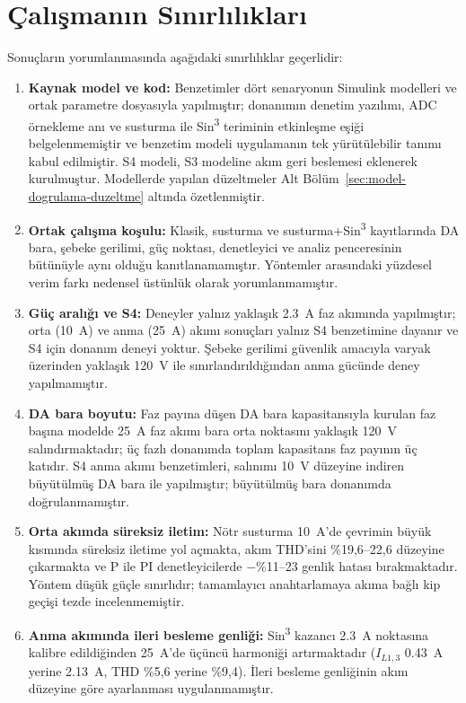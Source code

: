 \section{Çalışmanın Sınırlılıkları}

Sonuçların yorumlanmasında aşağıdaki sınırlılıklar geçerlidir:

\begin{enumerate}
  \item \textbf{Kaynak model ve kod:} Benzetimler dört senaryonun Simulink modelleri ve ortak parametre dosyasıyla yapılmıştır; donanımın denetim yazılımı, ADC örnekleme anı ve susturma ile Sin\textsuperscript{3} teriminin etkinleşme eşiği belgelenmemiştir ve benzetim modeli uygulamanın tek yürütülebilir tanımı kabul edilmiştir. S4 modeli, S3 modeline akım geri beslemesi eklenerek kurulmuştur. Modellerde yapılan düzeltmeler Alt Bölüm~\ref{sec:model-dogrulama-duzeltme} altında özetlenmiştir.
  \item \textbf{Ortak çalışma koşulu:} Klasik, susturma ve susturma+Sin\textsuperscript{3} kayıtlarında DA bara, şebeke gerilimi, güç noktası, denetleyici ve analiz penceresinin bütünüyle aynı olduğu kanıtlanamamıştır. Yöntemler arasındaki yüzdesel verim farkı nedensel üstünlük olarak yorumlanmamıştır.
  \item \textbf{Güç aralığı ve S4:} Deneyler yalnız yaklaşık \SI{2.3}{\ampere} faz akımında yapılmıştır; orta (\SI{10}{\ampere}) ve anma (\SI{25}{\ampere}) akımı sonuçları yalnız S4 benzetimine dayanır ve S4 için donanım deneyi yoktur. Şebeke gerilimi güvenlik amacıyla varyak üzerinden yaklaşık \SI{120}{\volt} ile sınırlandırıldığından anma gücünde deney yapılmamıştır.
  \item \textbf{DA bara boyutu:} Faz payına düşen DA bara kapasitansıyla kurulan faz başına modelde \SI{25}{\ampere} faz akımı bara orta noktasını yaklaşık \SI{120}{\volt} salındırmaktadır; üç fazlı donanımda toplam kapasitans faz payının üç katıdır. S4 anma akımı benzetimleri, salınımı \SI{10}{\volt} düzeyine indiren büyütülmüş DA bara ile yapılmıştır; büyütülmüş bara donanımda doğrulanmamıştır.
  \item \textbf{Orta akımda süreksiz iletim:} Nötr susturma \SI{10}{\ampere}'de çevrimin büyük kısmında süreksiz iletime yol açmakta, akım THD'sini \%19,6--22,6 düzeyine çıkarmakta ve P ile PI denetleyicilerde $-$\%11--23 genlik hatası bırakmaktadır. Yöntem düşük güçle sınırlıdır; tamamlayıcı anahtarlamaya akıma bağlı kip geçişi tezde incelenmemiştir.
  \item \textbf{Anma akımında ileri besleme genliği:} Sin\textsuperscript{3} kazancı \SI{2.3}{\ampere} noktasına kalibre edildiğinden \SI{25}{\ampere}'de üçüncü harmoniği artırmaktadır ($I_{L1,3}$ \SI{0.43}{\ampere} yerine \SI{2.13}{\ampere}, THD \%5,6 yerine \%9,4). İleri besleme genliğinin akım düzeyine göre ayarlanması uygulanmamıştır.

\end{enumerate}
